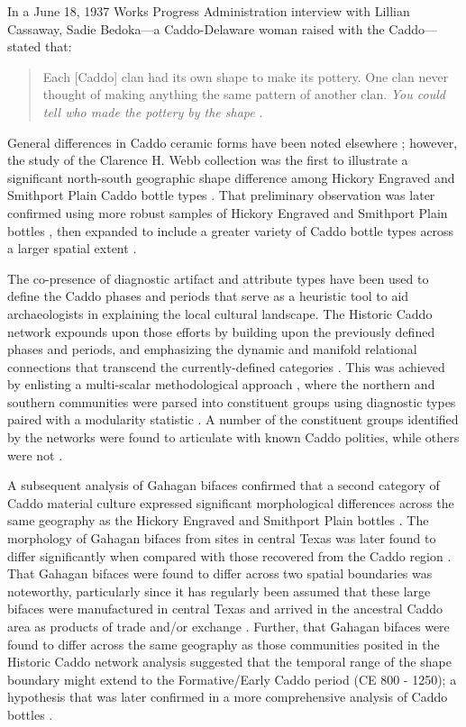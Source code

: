 \documentclass[smallextended]{svjour3}       %
\begin{document}
In a June 18, 1937 Works Progress Administration interview with Lillian
Cassaway, Sadie Bedoka---a Caddo-Delaware woman raised with the
Caddo---stated that:

\begin{quote}
Each {[}Caddo{]} clan had its own shape to make its pottery. One clan
never thought of making anything the same pattern of another clan.
\emph{You could tell who made the pottery by the shape}
\cite[395]{RN9357x}.
\end{quote}

General differences in Caddo ceramic forms have been noted elsewhere
\cite{RN5650,RN7129,RN7162}; however, the study of the Clarence H. Webb
collection was the first to illustrate a significant north-south
geographic shape difference among Hickory Engraved and Smithport Plain
Caddo bottle types \cite{RN8370}. That preliminary observation was later
confirmed using more robust samples of Hickory Engraved and Smithport
Plain bottles \cite{RN8074,RN7927}, then expanded to include a greater
variety of Caddo bottle types across a larger spatial extent
\cite{RN8312}.

The co-presence of diagnostic artifact and attribute types have been
used to define the Caddo phases and periods that serve as a heuristic
tool to aid archaeologists in explaining the local cultural landscape.
The Historic Caddo network expounds upon those efforts by building upon
the previously defined phases and periods, and emphasizing the dynamic
and manifold relational connections that transcend the currently-defined
categories \cite{RN8031}. This was achieved by enlisting a multi-scalar
methodological approach \cite{RN5644,RN8039}, where the northern and
southern communities were parsed into constituent groups using
diagnostic types paired with a modularity statistic
\cite{RN8051,RN8024}. A number of the constituent groups identified by
the networks were found to articulate with known Caddo polities, while
others were not \cite{RN8031}.

A subsequent analysis of Gahagan bifaces confirmed that a second
category of Caddo material culture expressed significant morphological
differences across the same geography as the Hickory Engraved and
Smithport Plain bottles \cite{RN8158}. The morphology of Gahagan bifaces
from sites in central Texas was later found to differ significantly when
compared with those recovered from the Caddo region \cite{RN8322}. That
Gahagan bifaces were found to differ across two spatial boundaries was
noteworthy, particularly since it has regularly been assumed that these
large bifaces were manufactured in central Texas and arrived in the
ancestral Caddo area as products of trade and/or exchange
\cite{RN8322,RN8158}. Further, that Gahagan bifaces were found to differ
across the same geography as those communities posited in the Historic
Caddo network analysis suggested that the temporal range of the shape
boundary might extend to the Formative/Early Caddo period (CE 800 -
1250); a hypothesis that was later confirmed in a more comprehensive
analysis of Caddo bottles \cite{RN8312}.
\end{document}

